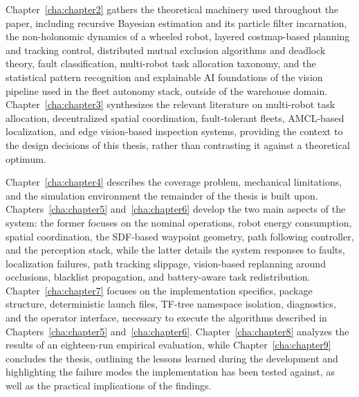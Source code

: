 Chapter~\ref{cha:chapter2} gathers the theoretical machinery used throughout the paper, including recursive Bayesian estimation and its particle filter incarnation, the non-holonomic dynamics of a wheeled robot, layered costmap-based planning and tracking control, distributed mutual exclusion algorithms and deadlock theory, fault classification, multi-robot task allocation taxonomy, and the statistical pattern recognition and explainable AI foundations of the vision pipeline used in the fleet autonomy stack, outside of the warehouse domain. Chapter~\ref{cha:chapter3} synthesizes the relevant literature on multi-robot task allocation, decentralized spatial coordination, fault-tolerant fleets, AMCL-based localization, and edge vision-based inspection systems, providing the context to the design decisions of this thesis, rather than contrasting it against a theoretical optimum.

Chapter~\ref{cha:chapter4} describes the coverage problem, mechanical limitations, and the simulation environment the remainder of the thesis is built upon. Chapters~\ref{cha:chapter5} and~\ref{cha:chapter6} develop the two main aspects of the system: the former focuses on the nominal operations, robot energy consumption, spatial coordination, the SDF-based waypoint geometry, path following controller, and the perception stack, while the latter details the system responses to faults, localization failures, path tracking slippage, vision-based replanning around occlusions, blacklist propagation, and battery-aware task redistribution. Chapter~\ref{cha:chapter7} focuses on the implementation specifics, package structure, deterministic launch files, TF-tree namespace isolation, diagnostics, and the operator interface, necessary to execute the algorithms described in Chapters~\ref{cha:chapter5} and~\ref{cha:chapter6}. Chapter~\ref{cha:chapter8} analyzes the results of an eighteen-run empirical evaluation, while Chapter~\ref{cha:chapter9} concludes the thesis, outlining the lessons learned during the development and highlighting the failure modes the implementation has been tested against, as well as the practical implications of the findings.